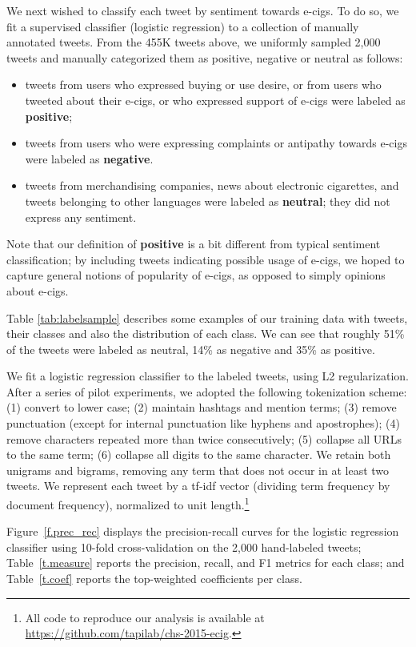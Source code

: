 \documentclass{sig-alternate}
\begin{document}
We next wished to classify each tweet by sentiment towards e-cigs. To do so, we fit a supervised classifier (logistic regression) to a collection of manually annotated tweets. From the 455K tweets above, we uniformly sampled 2,000 tweets and manually categorized them as positive, negative or neutral as follows: 
\begin{itemize}
\item  tweets from users who expressed buying or use desire, or from users who tweeted about their e-cigs, or who expressed support of e-cigs were labeled as {\bf positive}; 
\item  tweets from users who were expressing complaints or antipathy towards e-cigs were labeled as {\bf negative}. 
\item  tweets from merchandising companies, news about electronic cigarettes, and tweets belonging to other languages were labeled as {\bf neutral}; they did not express any sentiment.
\end{itemize}

Note that our definition of {\bf positive} is a bit different from typical sentiment classification; by including tweets indicating possible usage of e-cigs, we hoped to capture general notions of popularity of e-cigs, as opposed to simply opinions about e-cigs.



Table \ref{tab:labelsample} describes some examples of our training data with tweets, their classes and also the distribution of each class. We can see that roughly 51\% of the tweets were labeled as neutral, 14\% as negative and 35\% as positive. 

We fit a logistic regression classifier to the labeled tweets, using L2 regularization. After a series of pilot experiments, we adopted the following tokenization scheme: (1) convert to lower case; (2) maintain hashtags and mention terms; (3) remove punctuation (except for internal punctuation like hyphens and apostrophes); (4) remove characters repeated more than twice consecutively; (5) collapse all URLs to the same term; (6) collapse all digits to the same character. We retain both unigrams and bigrams, removing any term that does not occur in at least two tweets. We represent each tweet by a tf-idf vector (dividing term frequency by document frequency), normalized to unit length.\footnote{All code to reproduce our analysis is available at \url{https://github.com/tapilab/chs-2015-ecig}.}

Figure~\ref{f.prec_rec} displays the precision-recall curves for the logistic regression classifier using 10-fold cross-validation on the 2,000 hand-labeled tweets; Table~\ref{t.measure} reports the precision, recall, and F1 metrics for each class; and Table~\ref{t.coef} reports the top-weighted coefficients per class.
\end{document}

